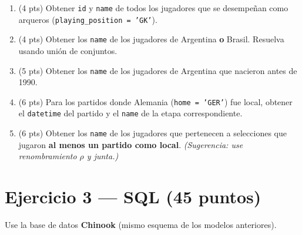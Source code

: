 \documentclass[11pt,a4paper]{article}
\begin{document}
\begin{enumerate}
  \item (4 pts) Obtener \texttt{id} y \texttt{name} de todos los jugadores que se desempeñan como arqueros (\texttt{playing\_position = 'GK'}).

  \vspace{2cm}

  \item (4 pts) Obtener los \texttt{name} de los jugadores de Argentina \textbf{o} Brasil. Resuelva usando unión de conjuntos.

  \vspace{2.5cm}

  \item (5 pts) Obtener los \texttt{name} de los jugadores de Argentina que nacieron antes de 1990.

  \vspace{2.5cm}

  \item (6 pts) Para los partidos donde Alemania (\texttt{home = 'GER'}) fue local, obtener el \texttt{datetime} del partido y el \texttt{name} de la etapa correspondiente.

  \vspace{3cm}

  \item (6 pts) Obtener los \texttt{name} de los jugadores que pertenecen a selecciones que jugaron \textbf{al menos un partido como local}. \emph{(Sugerencia: use renombramiento $\rho$ y junta.)}

  \vspace{3.5cm}
\end{enumerate}

\newpage

\section*{Ejercicio 3 — SQL \hfill\normalfont(45 puntos)}

Use la base de datos \textbf{Chinook} (mismo esquema de los modelos anteriores).
\end{document}
